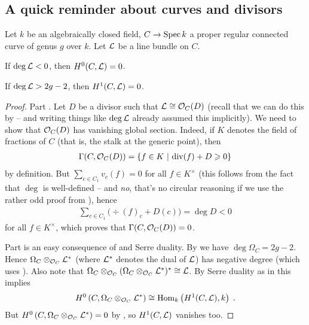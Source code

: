 \documentclass[a4paper,parskip=half,numbers=enddot, DIV=12]{scrreprt}
\renewcommand{\geq}{\geqslant}
\begin{document}
\subsection{A quick reminder about curves and divisors}
\begin{lem}
	Let $k$ be an algebraically closed field, $C\morphism\Spec k$ a proper regular connected curve of genus $g$ over $k$. Let $\mathcal{L}$ be a line bundle on $C$.
	\begin{alphanumerate}
		\item If $\deg \mathcal{L}<0$, then $H^0(C,\mathcal{L})=0$.
		\item If $\deg \mathcal{L}>2g-2$, then $H^1(C,\mathcal{L})=0$.
	\end{alphanumerate}
\end{lem}
\begin{proof}
	Part . Let $D$ be a divisor such that $\mathcal{L}\cong \mathcal{O}_C(D)$ (recall that we can do this by \cite[Proposition~3.0.1]{alggeo2} -- and writing things like $\deg \mathcal{L}$ already assumed this implicitly). We need to show that $\mathcal{O}_C(D)$ has vanishing global section. Indeed, if $K$ denotes the field of fractions of $C$ (that is, the stalk at the generic point), then
	\begin{align*}
		\Gamma(C,\Oo_C(D))=\left\{f\in K\st \div(f)+D\geq 0\right\}
	\end{align*}
	by definition. But $\sum_{c\in C_1}v_c(f)=0$ for all $f\in K^\times$ (this follows from the fact that $\deg$ is well-defined -- and \emph{no}, that's no circular reasoning if we use the rather odd proof from \cite[p.]{alggeo2}), hence 
	\begin{align*}
		\sum_{c\in C_1}\big(\div(f)_c+D(c)\big)=\deg D<0
	\end{align*}
	for all $f\in K^\times$, which proves that $\Gamma(C,\mathcal{O}_C(D))=0$.
	
	Part  is an easy consequence of  and Serre duality. By \cite[Corollary~3.1.2]{alggeo2} we have $\deg\Omega_C=2g-2$. Hence $\Omega_C\otimes_{\mathcal{O}_C}\mathcal{L}^*$ (where $\mathcal{L}^*$ denotes the dual of $\mathcal{L}$) has negative degree (which uses \cite[Proposition~3.0.2]{alggeo2}). Also note that $\Omega_C\otimes_{\mathcal{O}_C}(\Omega_C\otimes_{\mathcal{O}_C}\mathcal{L}^*)^*\cong \mathcal{L}$. By Serre duality as in \cite[Theorem~7]{alggeo2} this implies
	\begin{align*}
		H^0\left(C,\Omega_C\otimes_{\mathcal{O}_C}\mathcal{L}^*\right)\cong \operatorname{Hom}_k\left(H^1(C,\mathcal{L}),k\right)\;.
	\end{align*}
	But $H^0\left(C,\Omega_C\otimes_{\mathcal{O}_C}\mathcal{L}^*\right)=0$ by , so $H^1(C,\mathcal{L})$ vanishes too.
\end{proof}
\end{document}
